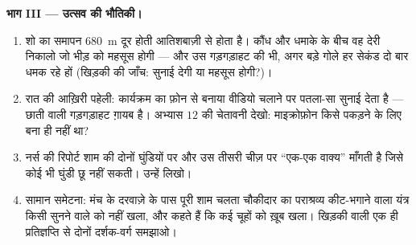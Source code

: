 \begin{problem}
\medskip\noindent\textbf{भाग III --- उत्सव की भौतिकी।}
\begin{enumerate}[resume]
  \item शो का समापन \qty{680}{m} दूर होती आतिशबाज़ी से होता है। कौंध
        और धमाके के बीच वह देरी निकालो जो भीड़ को महसूस होगी --- और
        उस गड़गड़ाहट की  भी, अगर बड़े गोले हर सेकंड दो बार धमक
        रहे हों (खिड़की की जाँच: सुनाई देगी या महसूस होगी?)।
  \item रात की आख़िरी पहेली: कार्यक्रम का फ़ोन से बनाया वीडियो चलाने
        पर पतला-सा सुनाई देता है --- छाती वाली गड़गड़ाहट ग़ायब है।
        अभ्यास $12$ की चेतावनी देखो: माइक्रोफ़ोन किसे पकड़ने के लिए
        बना ही नहीं था?
  \item नर्स की रिपोर्ट शाम की दोनों घुंडियों पर और उस तीसरी चीज़ पर
        ``एक-एक वाक्य'' माँगती है जिसे कोई भी घुंडी छू नहीं सकती।
        उन्हें लिखो।
  \item सामान समेटना: मंच के दरवाज़े के पास पूरी शाम चलता चौकीदार का
        पराश्रव्य कीट-भगाने वाला यंत्र किसी सुनने वाले को नहीं खला,
        और कहते हैं कि कई चूहों को ख़ूब खला। खिड़की वाली एक ही
        प्रतिज्ञप्ति से दोनों दर्शक-वर्ग समझाओ।
\end{enumerate}
\end{problem}
